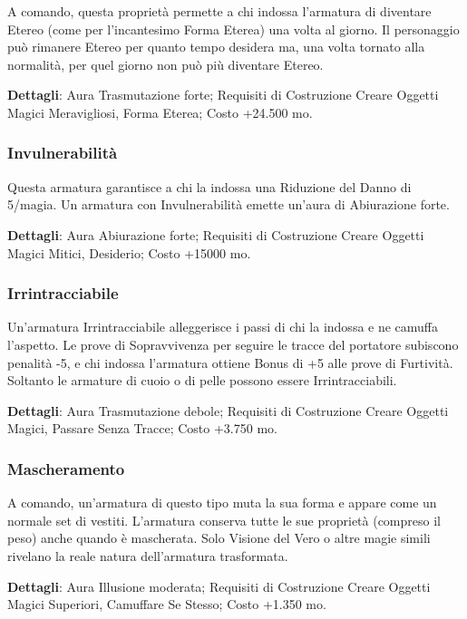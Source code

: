 \begin{multicols}{2}
	A comando, questa proprietà permette a chi indossa l'armatura di diventare Etereo (come per l'incantesimo Forma Eterea) una volta al giorno. Il personaggio può rimanere Etereo per quanto tempo desidera ma, una volta tornato alla normalità, per quel giorno non può più diventare Etereo.

	\textbf{Dettagli}: Aura Trasmutazione forte; Requisiti di Costruzione Creare Oggetti Magici Meravigliosi, Forma Eterea; Costo +24.500 mo.

	\subsubsection*{Invulnerabilità}

	Questa armatura garantisce a chi la indossa una Riduzione del Danno di 5/magia. Un armatura con Invulnerabilità emette un'aura di Abiurazione forte.

	\textbf{Dettagli}: Aura Abiurazione forte; Requisiti di Costruzione Creare Oggetti Magici Mitici, Desiderio; Costo +15000 mo.

	\subsubsection*{Irrintracciabile}

	Un'armatura Irrintracciabile alleggerisce i passi di chi la indossa e ne camuffa l'aspetto. Le prove di Sopravvivenza per seguire le tracce del portatore subiscono penalità -5, e chi indossa l'armatura ottiene Bonus di +5 alle prove di Furtività. Soltanto le armature di cuoio o di pelle possono essere Irrintracciabili.

	\textbf{Dettagli}: Aura Trasmutazione debole; Requisiti di Costruzione Creare Oggetti Magici, Passare Senza Tracce; Costo +3.750 mo.

	\subsubsection*{Mascheramento}

	A comando, un'armatura di questo tipo muta la sua forma e appare come un normale set di vestiti. L'armatura conserva tutte le sue proprietà (compreso il peso) anche quando è mascherata. Solo Visione del Vero o altre magie simili rivelano la reale natura dell'armatura trasformata.

	\textbf{Dettagli}: Aura Illusione moderata; Requisiti di Costruzione Creare Oggetti Magici Superiori, Camuffare Se Stesso; Costo +1.350 mo.


\end{multicols}
